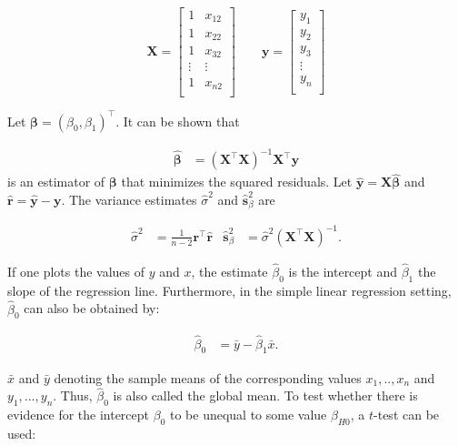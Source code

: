 \documentclass[11pt,a4paper,twoside]{book}\usepackage[]{graphicx}\usepackage[]{color}
\begin{document}
\begin{equation*}
\mathbf{X} = 
\begin{bmatrix}
1 & x_{12} \\
1 & x_{22} \\
1 & x_{32} \\
\vdots & \vdots \\
1 & x_{n2} \\
\end{bmatrix} 
\qquad
\mathbf{y} = 
\begin{bmatrix}
y_1 \\
y_2 \\
y_3 \\
\vdots \\
y_n \\
\end{bmatrix}
\end{equation*}

\vspace{2mm}

Let $\mathbf{\beta} = (\beta_0, \beta_1)^\top$. It can be shown that 

\begin{align}
\hat{\mathbf{\beta}} &= (\mathbf{X}^\top \mathbf{X})^{-1} \mathbf{X}^\top \mathbf{y} \label{eq:regression.parameters}
\end{align}
is an estimator of $\mathbf{\beta}$ that minimizes the squared residuals. Let $\hat{\mathbf{y}} = \mathbf{X}\hat{\mathbf{\beta}}$ and $\hat{\mathbf{r}} = \hat{\mathbf{y}} - \mathbf{y}$. The variance estimates $\hat{\sigma}^2$ and $\hat{\mathbf{s}}_\beta^2$ are

\begin{align}
\hat{\sigma}^2 &= \frac{1}{n-2}\mathbf{r}^\top \hat{\mathbf{r}} & \hat{\mathbf{s}}_\beta^2 &= \hat{\sigma}^2 (\mathbf{X}^\top \mathbf{X})^{-1}. \label{eq:regression.variances}
\end{align}

If one plots the values of $y$ and $x$, the estimate $\hat{\beta}_0$ is the intercept and $\hat{\beta}_1$ the slope of the regression line. Furthermore, in the simple linear regression setting, $\hat{\beta}_0$ can also be obtained by:

\begin{align}
\hat{\beta}_0 &= \bar{y} - \hat{\beta}_1 \bar{x}. \nonumber
\end{align}

$\bar{x}$ and $\bar{y}$ denoting the sample means of the corresponding values $x_1, .., x_n$ and $y_1, ..., y_n$. Thus, $\hat{\beta}_0$ is also called the global mean.
To test whether there is evidence for the intercept $\beta_0$ to be unequal to some value $\beta_{H0}$, a $t$-test can be used:
\end{document}
